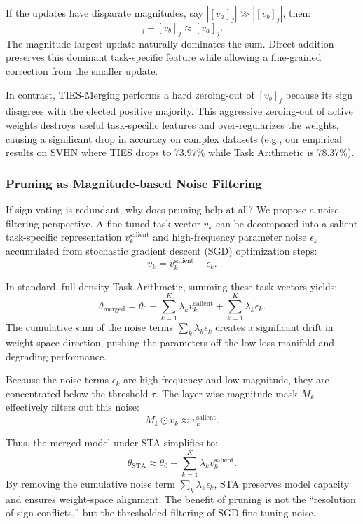 If the updates have disparate magnitudes, say $|[v_{a}]_j| \gg |[v_{b}]_j|$, then:
\begin{equation}
    [v_{a}]_j + [v_{b}]_j \approx [v_{a}]_j.
\end{equation}
The magnitude-largest update naturally dominates the sum. Direct addition preserves this dominant task-specific feature while allowing a fine-grained correction from the smaller update. 

In contrast, TIES-Merging performs a hard zeroing-out of $[v_{b}]_j$ because its sign disagrees with the elected positive majority. This aggressive zeroing-out of active weights destroys useful task-specific features and over-regularizes the weights, causing a significant drop in accuracy on complex datasets (e.g., our empirical results on SVHN where TIES drops to 73.97\% while Task Arithmetic is 78.37\%).

\subsubsection{Pruning as Magnitude-based Noise Filtering}
If sign voting is redundant, why does pruning help at all? We propose a noise-filtering perspective.
A fine-tuned task vector $v_k$ can be decomposed into a salient task-specific representation $v_k^{\text{salient}}$ and high-frequency parameter noise $\epsilon_k$ accumulated from stochastic gradient descent (SGD) optimization steps:
\begin{equation}
    v_k = v_k^{\text{salient}} + \epsilon_k.
\end{equation}

In standard, full-density Task Arithmetic, summing these task vectors yields:
\begin{equation}
    \theta_{\text{merged}} = \theta_0 + \sum_{k=1}^K \lambda_k v_k^{\text{salient}} + \sum_{k=1}^K \lambda_k \epsilon_k.
\end{equation}
The cumulative sum of the noise terms $\sum_k \lambda_k \epsilon_k$ creates a significant drift in weight-space direction, pushing the parameters off the low-loss manifold and degrading performance.

Because the noise terms $\epsilon_k$ are high-frequency and low-magnitude, they are concentrated below the threshold $\tau$. The layer-wise magnitude mask $M_k$ effectively filters out this noise:
\begin{equation}
    M_k \odot v_k \approx v_k^{\text{salient}}.
\end{equation}

Thus, the merged model under STA simplifies to:
\begin{equation}
    \theta_{\text{STA}} \approx \theta_0 + \sum_{k=1}^K \lambda_k v_k^{\text{salient}}.
\end{equation}
By removing the cumulative noise term $\sum_k \lambda_k \epsilon_k$, STA preserves model capacity and ensures weight-space alignment. The benefit of pruning is not the ``resolution of sign conflicts,'' but the thresholded filtering of SGD fine-tuning noise.

